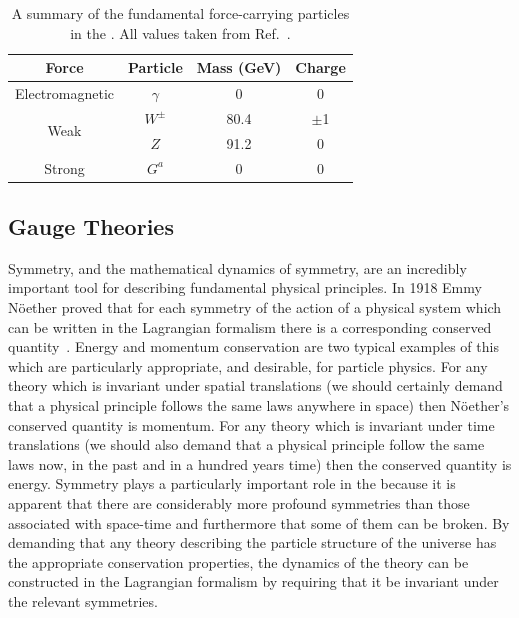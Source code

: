 \begin{table}
  \begin{tabular}{c | c c c}
  Force & Particle & Mass (GeV) & Charge \\
  \hline
  Electromagnetic & $\gamma$ & 0 & 0 \\
  \multirow{2}{*}{Weak} & $W^{\pm}$ & 80.4 & $\pm$1 \\
                        & $Z$   & 91.2 & 0 \\
  Strong                & $G^{a}$   & 0 & 0 \\
  \end{tabular}
  \caption[A summary of the fundamental force-carrying particles in the \acs{SM}]{A summary of the fundamental force-carrying particles in the \SM. All values taken from Ref.~\cite{pdg}.}
  \label{tab:forces}
\end{table}

\subsection{Gauge Theories}

Symmetry, and the mathematical dynamics of symmetry, are an incredibly important tool for describing fundamental physical principles. In 1918 Emmy N\"{o}ether proved that for each symmetry of the action of a physical system which can be written in the Lagrangian formalism there is a corresponding conserved quantity~\cite{noether,noether_trans}. Energy and momentum conservation are two typical examples of this which are particularly appropriate, and desirable, for particle physics. For any theory which is invariant under spatial translations (we should certainly demand that a physical principle follows the same laws anywhere in space) then N\"{o}ether's conserved quantity is momentum. For any theory which is invariant under time translations (we should also demand that a physical principle follow the same laws now, in the past and in a hundred years time) then the conserved quantity is energy. Symmetry plays a particularly important role in the \SM because it is apparent that there are considerably more profound symmetries than those associated with space-time and furthermore that some of them can be broken. By demanding that any theory describing the particle structure of the universe has the appropriate conservation properties, the dynamics of the theory can be constructed in the Lagrangian formalism by requiring that it be invariant under the relevant symmetries.

